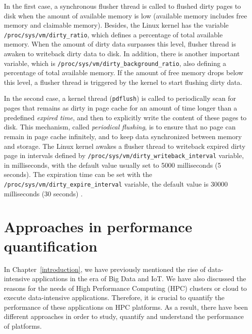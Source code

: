 In the first case, a synchronous flusher thread is called to flushed dirty pages 
to disk when the amount of available memory is low (available memory 
includes free memory and claimable memory).
Besides, the Linux kernel has the variable \texttt{/proc/sys/vm/dirty\_ratio}, 
which defines a percentage of total available memory. 
When the amount of dirty data surpasses this level, flusher thread is awaken 
to writeback dirty data to disk.
In addition, there is another important variable, 
which is \texttt{/proc/sys/vm/dirty\_background\_ratio},
also defining a percentage of total available memory. 
If the amount of free memory drops below this level, a flusher thread is 
triggered by the kernel to start flushing dirty data.

In the second case, a kernel thread (\texttt{pdflush}) is called to periodically 
scan for pages that remains as dirty in page cache for an amount of time 
longer than a predefined \textit{expired time}, and then to explicitly write 
the content of these pages to disk. 
This mechanism, called \textit{periodical flushing}, is to ensure that no page 
can remain in page cache infinitely, and to keep data synchronized between 
memory and storage.
The Linux kernel awakes a flusher thread to writeback expired dirty page in 
intervals defined by \texttt{/proc/sys/vm/dirty\_writeback\_interval} variable, 
in milliseconds, with the default value usually set to 5000 milliseconds (5 seconds). 
The expiration time can be set with the 
\texttt{/proc/sys/vm/dirty\_expire\_interval} variable, 
the default value is 30000 milliseconds (30 seconds) \cite{linuxdev3rd2010}.

\section{Approaches in performance quantification}

In Chapter~\ref{introduction}, we have previously mentioned the 
rise of data-intensive applications in the era of Big Data and IoT.
We have also discussed the reasons for the needs of High Performance 
Computing (HPC) clusters or cloud to execute data-intensive applications.
Therefore, it is crucial to quantify the performance of these applications 
on HPC platforms. As a result, there have been different approaches 
in order to study, quantify and understand the performance of platforms.

